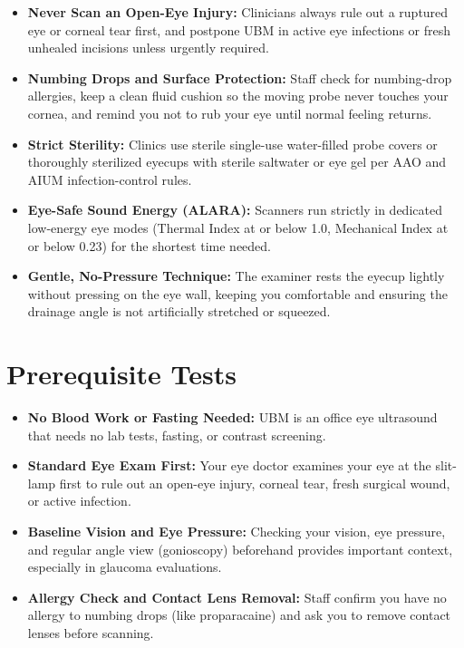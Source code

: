 \begin{itemize}
    \item \textbf{Never Scan an Open-Eye Injury:} Clinicians always rule out a ruptured eye or corneal tear first, and postpone UBM in active eye infections or fresh unhealed incisions unless urgently required.
    \item \textbf{Numbing Drops and Surface Protection:} Staff check for numbing-drop allergies, keep a clean fluid cushion so the moving probe never touches your cornea, and remind you not to rub your eye until normal feeling returns.
    \item \textbf{Strict Sterility:} Clinics use sterile single-use water-filled probe covers or thoroughly sterilized eyecups with sterile saltwater or eye gel per AAO and AIUM infection-control rules.
    \item \textbf{Eye-Safe Sound Energy (ALARA):} Scanners run strictly in dedicated low-energy eye modes (Thermal Index at or below 1.0, Mechanical Index at or below 0.23) for the shortest time needed.
    \item \textbf{Gentle, No-Pressure Technique:} The examiner rests the eyecup lightly without pressing on the eye wall, keeping you comfortable and ensuring the drainage angle is not artificially stretched or squeezed.
\end{itemize}

\section{Prerequisite Tests}

\begin{itemize}
    \item \textbf{No Blood Work or Fasting Needed:} UBM is an office eye ultrasound that needs no lab tests, fasting, or contrast screening.
    \item \textbf{Standard Eye Exam First:} Your eye doctor examines your eye at the slit-lamp first to rule out an open-eye injury, corneal tear, fresh surgical wound, or active infection.
    \item \textbf{Baseline Vision and Eye Pressure:} Checking your vision, eye pressure, and regular angle view (gonioscopy) beforehand provides important context, especially in glaucoma evaluations.
    \item \textbf{Allergy Check and Contact Lens Removal:} Staff confirm you have no allergy to numbing drops (like proparacaine) and ask you to remove contact lenses before scanning.
\end{itemize}

